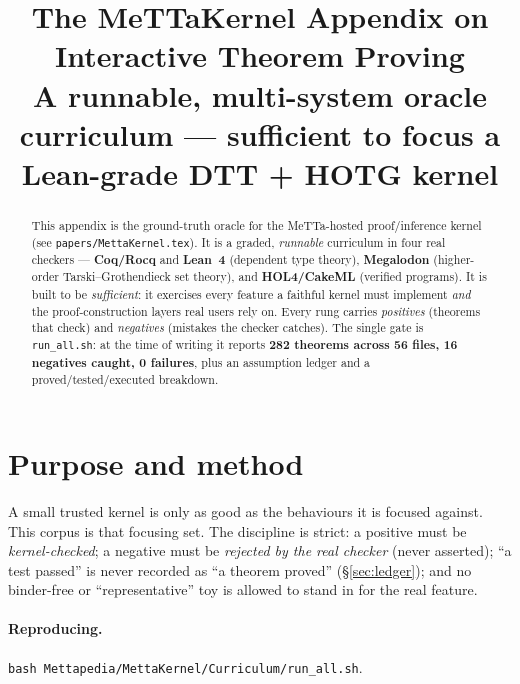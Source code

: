\documentclass[11pt]{article}
\title{The MeTTaKernel Appendix on Interactive Theorem Proving\\[2pt]
  \large A runnable, multi-system oracle curriculum --- sufficient to focus a
  Lean-grade DTT + HOTG kernel}
\date{}
\begin{document}
\maketitle

\begin{abstract}
This appendix is the ground-truth oracle for the MeTTa-hosted proof/inference kernel
(see \texttt{papers/MettaKernel.tex}). It is a graded, \emph{runnable} curriculum in four real
checkers --- \textbf{Coq/Rocq} and \textbf{Lean~4} (dependent type theory), \textbf{Megalodon}
(higher-order Tarski--Grothendieck set theory), and \textbf{HOL4/CakeML} (verified programs). It is
built to be \emph{sufficient}: it exercises every feature a faithful kernel must implement
\emph{and} the proof-construction layers real users rely on. Every rung carries \emph{positives}
(theorems that check) and \emph{negatives} (mistakes the checker catches). The single gate is
\texttt{run\_all.sh}: at the time of writing it reports \textbf{282 theorems across 56 files, 16
negatives caught, 0 failures}, plus an assumption ledger and a proved/tested/executed breakdown.
\end{abstract}

\section{Purpose and method}
A small trusted kernel is only as good as the behaviours it is focused against. This corpus is that
focusing set. The discipline is strict: a positive must be \emph{kernel-checked}; a negative must be
\emph{rejected by the real checker} (never asserted); ``a test passed'' is never recorded as ``a
theorem proved'' (\S\ref{sec:ledger}); and no binder-free or ``representative'' toy is allowed to
stand in for the real feature.

\paragraph{Reproducing.} \texttt{bash Mettapedia/MettaKernel/Curriculum/run\_all.sh}.
\end{document}

